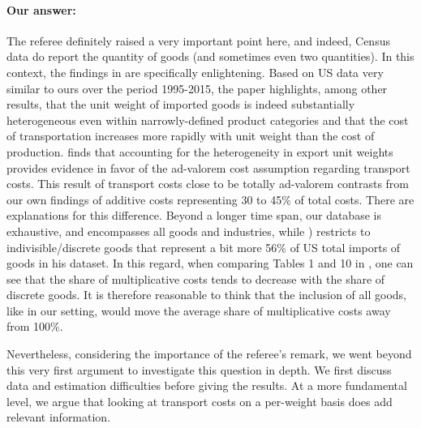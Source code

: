 \documentclass[a4paper,11pt]{article}
\begin{document}
\paragraph{Our answer:}
\noindent %
The referee definitely raised a very important point here, and indeed, Census data do report the quantity of goods (and sometimes even two quantities).
In this context, the findings in \cite{Lashkaripour_JIE2020} are specifically enlightening.
Based on US data very similar to ours over the period 1995-2015, the paper highlights, among other results, that the unit weight of imported goods is indeed substantially heterogeneous even within narrowly-defined product categories and that the cost of transportation increases more rapidly with unit weight than the cost of production. \cite{Lashkaripour_JIE2020} finds that accounting for the heterogeneity in export unit weights provides evidence in favor of the ad-valorem cost assumption regarding transport costs.
This result of transport costs close to be totally ad-valorem contrasts from our own findings of additive costs representing 30 to 45\% of total costs. There are explanations for this difference. Beyond a longer time span, our database is exhaustive, and encompasses all goods and industries, while \citet{Lashkaripour_JIE2020}) restricts to indivisible/discrete goods that represent a bit more 56\% of US total imports of goods in his dataset. In this regard, when comparing Tables 1 and 10 in \citet{Lashkaripour_JIE2020}, one can see that the share of multiplicative costs tends to decrease with the share of discrete goods. It is therefore reasonable to think that the inclusion of all goods, like in our setting, would move the average share of multiplicative costs away from 100\%.

Nevertheless, considering the importance of the referee's remark, we went beyond this very first argument to investigate this question in depth. We first discuss data and estimation difficulties before giving the results. At a more fundamental level, we argue that looking at transport costs on a per-weight basis does add relevant information.

\end{document}
